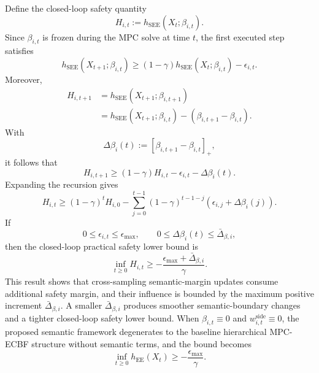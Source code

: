 \documentclass[journal]{IEEEtranTIE}
\begin{document}
    Define the closed-loop safety quantity
    \begin{equation}
    H_{i,t}:=h_{\mathrm{SEE}}(X_t;\beta_{i,t}).
    \end{equation}
    Since $\beta_{i,t}$ is frozen during the MPC solve at time $t$, the first
    executed step satisfies
    \begin{equation}
    h_{\mathrm{SEE}}(X_{t+1};\beta_{i,t})
    \ge
    (1-\gamma)h_{\mathrm{SEE}}(X_t;\beta_{i,t})
    -\epsilon_{i,t}.
    \end{equation}
    Moreover,
    \begin{equation}
    \begin{aligned}
    H_{i,t+1}
    &=h_{\mathrm{SEE}}(X_{t+1};\beta_{i,t+1})\\
    &=h_{\mathrm{SEE}}(X_{t+1};\beta_{i,t})
    -(\beta_{i,t+1}-\beta_{i,t}).
    \end{aligned}
    \end{equation}
    With
    \begin{equation}
    \Delta\beta_i(t):=[\beta_{i,t+1}-\beta_{i,t}]_+,
    \end{equation}
    it follows that
    \begin{equation}
    H_{i,t+1}
    \ge
    (1-\gamma)H_{i,t}-\epsilon_{i,t}-\Delta\beta_i(t).
    \end{equation}
    Expanding the recursion gives
    \begin{equation}
    H_{i,t}
    \ge
    (1-\gamma)^tH_{i,0}
    -
    \sum_{j=0}^{t-1}(1-\gamma)^{t-1-j}
    \left(\epsilon_{i,j}+\Delta\beta_i(j)\right).
    \end{equation}
    If
    \begin{equation}
    0\le\epsilon_{i,t}\le\epsilon_{\max},\qquad
    0\le\Delta\beta_i(t)\le\bar{\Delta}_{\beta,i},
    \end{equation}
    then the closed-loop practical safety lower bound is
    \begin{equation}
    \inf_{t\ge0}H_{i,t}
    \ge
    -\frac{\epsilon_{\max}+\bar{\Delta}_{\beta,i}}{\gamma}.
    \end{equation}
    This result shows that cross-sampling semantic-margin updates consume
    additional safety margin, and their influence is bounded by the maximum
    positive increment $\bar{\Delta}_{\beta,i}$. A smaller
    $\bar{\Delta}_{\beta,i}$ produces smoother semantic-boundary changes and a
    tighter closed-loop safety lower bound.
    When $\beta_{i,t}\equiv0$ and $w_{i,t}^{\mathrm{side}}\equiv0$, the proposed
    semantic framework degenerates to the baseline hierarchical MPC-ECBF
    structure without semantic terms, and the bound becomes
    \begin{equation}
    \inf_{t\ge0}h_{\mathrm{EE}}(X_t)
    \ge
    -\frac{\epsilon_{\max}}{\gamma}.
    \end{equation}
\end{document}

